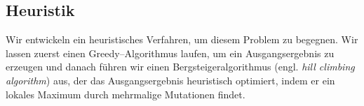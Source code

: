 \subsection{Heuristik}
Wir entwickeln ein heuristisches Verfahren, um diesem Problem zu begegnen. 
Wir lassen zuerst einen Greedy--Algorithmus laufen, um ein Ausgangsergebnis zu erzeugen und
danach führen wir einen Bergsteigeralgorithmus (engl. \textit{hill climbing algorithm}) aus,
der das Ausgangsergebnis heuristisch optimiert, indem er ein lokales Maximum durch mehrmalige
Mutationen findet.





